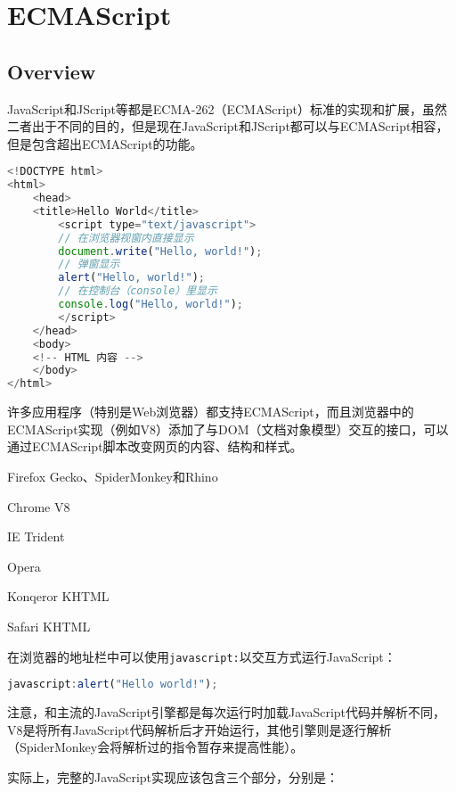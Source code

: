 \part{ECMAScript}

\chapter{Overview}

JavaScript和JScript等都是ECMA-262（ECMAScript）标准的实现和扩展，虽然二者出于不同的目的，但是现在JavaScript和JScript都可以与ECMAScript相容，但是包含超出ECMAScript的功能。

\begin{lstlisting}[language=JavaScript]
<!DOCTYPE html>
<html>
    <head>
    <title>Hello World</title>
        <script type="text/javascript">
        // 在浏览器视窗内直接显示
        document.write("Hello, world!"); 
        // 弹窗显示
        alert("Hello, world!"); 
        // 在控制台（console）里显示
        console.log("Hello, world!");
        </script>
    </head>
    <body>
    <!-- HTML 内容 -->
    </body>
</html>
\end{lstlisting}


许多应用程序（特别是Web浏览器）都支持ECMAScript，而且浏览器中的ECMAScript实现（例如V8）添加了与DOM（文档对象模型）交互的接口，可以通过ECMAScript脚本改变网页的内容、结构和样式。

\begin{compactitem}
\item Firefox Gecko、SpiderMonkey和Rhino
\item Chrome V8
\item IE Trident
\item Opera
\item Konqeror KHTML
\item  Safari KHTML
\end{compactitem}


在浏览器的地址栏中可以使用\texttt{javascript:}以交互方式运行JavaScript：

\begin{lstlisting}[language=JavaScript]
javascript:alert("Hello world!");
\end{lstlisting}

注意，和主流的JavaScript引擎都是每次运行时加载JavaScript代码并解析不同，V8是将所有JavaScript代码解析后才开始运行，其他引擎则是逐行解析（SpiderMonkey会将解析过的指令暂存来提高性能）。

实际上，完整的JavaScript实现应该包含三个部分，分别是：

